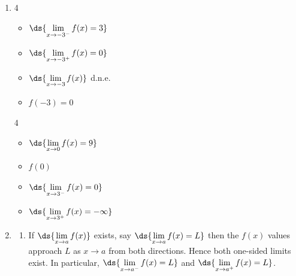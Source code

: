 \documentclass{ximera}
\begin{document}
	\author{Stitz-Zeager}

\begin{enumerate}

\item  \begin{multicols}{4} \begin{itemize} 

\item $\ds{\lim_{x \rightarrow -3^{-}} f(x) = 3}$

\item $\ds{\lim_{x \rightarrow -3^{+}} f(x) = 0}$

\item $\ds{\lim_{x \rightarrow -3} f(x)}$ d.n.e.

\item $f(-3) = 0$

\end{itemize}

\end{multicols}

\bigskip

\begin{multicols}{4}

\begin{itemize}

\item $\ds{\lim_{x \rightarrow 0} f(x) = 9}$

\item  $f(0)$

\item $\ds{\lim_{x \rightarrow 3^{-}} f(x) = 0}$

\item $\ds{\lim_{x \rightarrow 3^{+}} f(x) = -\infty}$
\end{itemize}

\end{multicols}

\bigskip


\item  \begin{enumerate}  \item  If $\ds{\lim_{x \rightarrow a} f(x)}$ exists, say $\ds{\lim_{x \rightarrow a} f(x) = L}$ then the $f(x)$ values approach  $L$  as $x \rightarrow a$ from both directions.  Hence both one-sided limits exist.  In particular,  $\ds{\lim_{x \rightarrow a^{-}} f(x) = L}$ and $\ds{\lim_{x \rightarrow a^{+}} f(x) = L}$.


\end{enumerate}
\end{enumerate}
\end{document}
